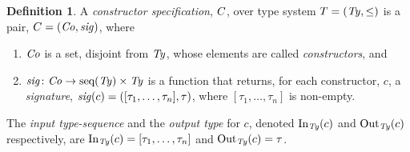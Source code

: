 \documentclass[a4paper]{article}
\theoremstyle{definition}
\newtheorem{definition}{Definition}
\begin{document}
		\begin{definition}\label{defn:constructionSpecification}
			A \textit{constructor specification}, $C$, over type system $T=(\mathit{Ty},\leq)$ is a pair, $C=(\mathit{Co}, \mathit{sig})$,  where
			\begin{enumerate}[itemsep=0pt,topsep=4pt]
				\item $\mathit{Co}$ is a set, disjoint from $\mathit{Ty}$, whose elements are called \textit{constructors}, and
				\item $\mathit{sig}\colon \mathit{Co} \to \textup{seq}(\mathit{Ty})\times \mathit{Ty}$ is a function that returns, for each constructor, $c$, a \textit{signature}, $\mathit{sig}(c)=([\tau_1,\ldots,\tau_n], \tau)$, where $[\tau_1,\ldots,\tau_n]$ is non-empty.
			\end{enumerate}
			The \textit{input type-sequence} and the \textit{output type} for $c$, denoted $\operatorname{In}_{\mathit{Ty}}({c})$ and $\operatorname{Out}_{\mathit{Ty}}({c})$ respectively, are $\operatorname{In}_{\mathit{Ty}}({c})=[\tau_1,\ldots,\tau_n]$ and  $\operatorname{Out}_{\mathit{Ty}}({c})=\tau$.
		\end{definition}
\end{document}
